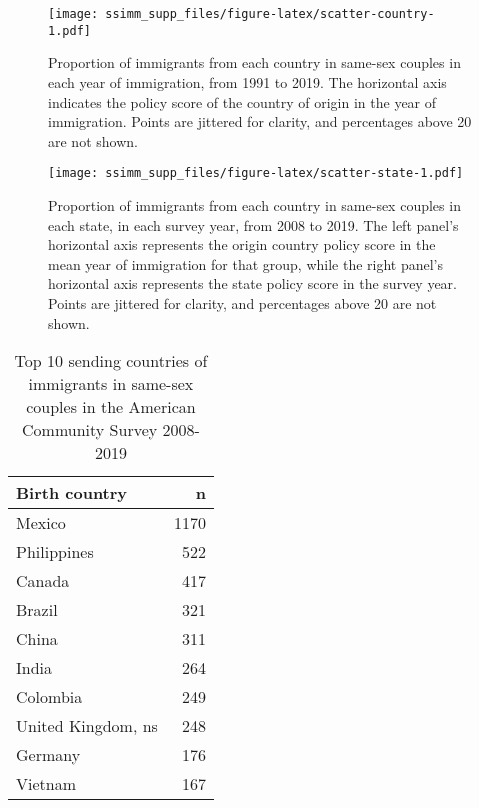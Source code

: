 \documentclass[
  11pt,
]{article}
\begin{document}
\begin{figure}
\centering
\texttt{[image: ssimm\_supp\_files/figure-latex/scatter-country-1.pdf]}
\caption{\label{fig:scatter-country}Proportion of immigrants from each country in same-sex couples in each year of immigration, from 1991 to 2019. The horizontal axis indicates the policy score of the country of origin in the year of immigration. Points are jittered for clarity, and percentages above 20 are not shown.}
\end{figure}

\begin{figure}
\centering
\texttt{[image: ssimm\_supp\_files/figure-latex/scatter-state-1.pdf]}
\caption{\label{fig:scatter-state}Proportion of immigrants from each country in same-sex couples in each state, in each survey year, from 2008 to 2019. The left panel's horizontal axis represents the origin country policy score in the mean year of immigration for that group, while the right panel's horizontal axis represents the state policy score in the survey year. Points are jittered for clarity, and percentages above 20 are not shown.}
\end{figure}

\begin{table}

\caption{\label{tab:desc-top1}Top 10 sending countries of immigrants in same-sex couples in the American Community Survey 2008-2019}
\centering
\begin{tabular}[t]{lr}
\toprule
Birth country & n\\
\midrule
Mexico & 1170\\
Philippines & 522\\
Canada & 417\\
Brazil & 321\\
China & 311\\
\addlinespace
India & 264\\
Colombia & 249\\
United Kingdom, ns & 248\\
Germany & 176\\
Vietnam & 167\\
\bottomrule
\end{tabular}
\end{table}
\end{document}

